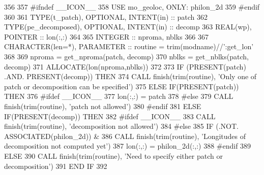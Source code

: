 \begin{DoxyCode}
356 
357 \textcolor{preprocessor}{#ifndef \_\_ICON\_\_}
358 \textcolor{preprocessor}{}    \textcolor{keywordtype}{USE }mo\_geoloc\textcolor{keywordtype}{, ONLY}: philon\_2d
359 \textcolor{preprocessor}{#endif}
360 \textcolor{preprocessor}{}
361     \textcolor{keywordtype}{TYPE}(t\_patch),       \textcolor{keywordtype}{OPTIONAL}, \textcolor{keywordtype}{INTENT(in)}  :: patch
362     \textcolor{keywordtype}{TYPE}(pe\_decomposed), \textcolor{keywordtype}{OPTIONAL}, \textcolor{keywordtype}{INTENT(in)}  :: decomp
363     \textcolor{keywordtype}{REAL(wp)}, \textcolor{keywordtype}{POINTER}                          :: lon(:,:)
364 
365     \textcolor{keywordtype}{INTEGER} :: nproma, nblks
366 
367     \textcolor{keywordtype}{CHARACTER(len=*)}, \textcolor{keywordtype}{PARAMETER} :: routine = trim(modname)//\textcolor{stringliteral}{':get\_lon'}
368 
369     nproma = get\_nproma(patch, decomp)
370     nblks  = get\_nblks(patch, decomp)
371     \textcolor{keyword}{ALLOCATE}(lon(nproma,nblks))
372 
373     \textcolor{keywordflow}{IF} (\textcolor{keyword}{PRESENT}(patch) .AND. \textcolor{keyword}{PRESENT}(decomp)) \textcolor{keywordflow}{THEN}
374       \textcolor{keyword}{CALL }finish(trim(routine), \textcolor{stringliteral}{'Only one of patch or decomposition can be specified'})
375     \textcolor{keywordflow}{ELSE} \textcolor{keywordflow}{IF}(\textcolor{keyword}{PRESENT}(patch)) \textcolor{keywordflow}{THEN}
376 \textcolor{preprocessor}{#ifdef \_\_ICON\_\_}
377 \textcolor{preprocessor}{}      lon(:,:) = patch%
378 \textcolor{preprocessor}{#else}
379 \textcolor{preprocessor}{}      \textcolor{keyword}{CALL }finish(trim(routine), \textcolor{stringliteral}{'patch not allowed'})
380 \textcolor{preprocessor}{#endif}
381 \textcolor{preprocessor}{}    \textcolor{keywordflow}{ELSE} \textcolor{keywordflow}{IF}(\textcolor{keyword}{PRESENT}(decomp)) \textcolor{keywordflow}{THEN}
382 \textcolor{preprocessor}{#ifdef \_\_ICON\_\_}
383 \textcolor{preprocessor}{}      \textcolor{keyword}{CALL }finish(trim(routine), \textcolor{stringliteral}{'decomposition not allowed'})
384 \textcolor{preprocessor}{#else}
385 \textcolor{preprocessor}{}      \textcolor{keywordflow}{IF} (.NOT. \textcolor{keyword}{ASSOCIATED}(philon\_2d)) &
386         \textcolor{keyword}{CALL }finish(trim(routine), \textcolor{stringliteral}{'Longitudes of decomposition not computed yet'})
387       lon(:,:) = philon\_2d(:,:)
388 \textcolor{preprocessor}{#endif}
389 \textcolor{preprocessor}{}    \textcolor{keywordflow}{ELSE}
390       \textcolor{keyword}{CALL }finish(trim(routine), \textcolor{stringliteral}{'Need to specify either patch or decomposition'})
391 \textcolor{keywordflow}{    END IF}
392 
\end{DoxyCode}


